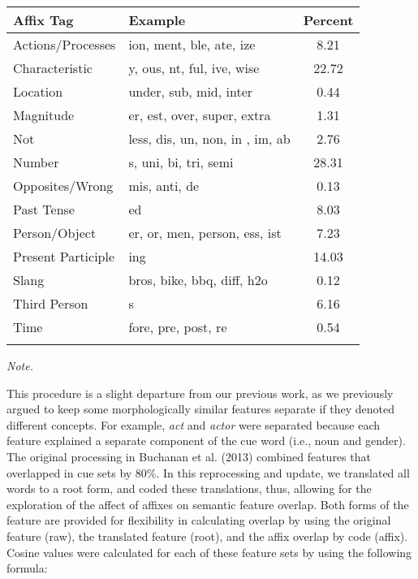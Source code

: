 \documentclass[english,man]{apa6}
\theoremstyle{definition}
\theoremstyle{definition}
\theoremstyle{definition}
\theoremstyle{remark}
\begin{document}
\begin{table}[tbp]
\begin{center}
\begin{threeparttable}
\caption{\label{tab:affix-table}}
\begin{tabular}{llc}
\toprule
Affix Tag & Example & Percent\\
\midrule
Actions/Processes & ion, ment, ble, ate, ize & 8.21\\
Characteristic & y, ous, nt, ful, ive, wise & 22.72\\
Location & under, sub, mid, inter & 0.44\\
Magnitude & er, est, over, super, extra & 1.31\\
Not & less, dis, un, non, in , im, ab & 2.76\\
Number & s, uni, bi, tri, semi & 28.31\\
Opposites/Wrong & mis, anti, de & 0.13\\
Past Tense & ed & 8.03\\
Person/Object & er, or, men, person, ess, ist & 7.23\\
Present Participle & ing & 14.03\\
Slang & bros, bike, bbq, diff, h2o & 0.12\\
Third Person & s & 6.16\\
Time & fore, pre, post, re & 0.54\\
\bottomrule
\addlinespace
\end{tabular}
\begin{tablenotes}[para]
\textit{Note.} 
\end{tablenotes}
\end{threeparttable}
\end{center}
\end{table}

This procedure is a slight departure from our previous work, as we
previously argued to keep some morphologically similar features separate
if they denoted different concepts. For example, \emph{act} and
\emph{actor} were separated because each feature explained a separate
component of the cue word (i.e., noun and gender). The original
processing in Buchanan et al. (2013) combined features that overlapped
in cue sets by 80\%. In this reprocessing and update, we translated all
words to a root form, and coded these translations, thus, allowing for
the exploration of the affect of affixes on semantic feature overlap.
Both forms of the feature are provided for flexibility in calculating
overlap by using the original feature (raw), the translated feature
(root), and the affix overlap by code (affix). Cosine values were
calculated for each of these feature sets by using the following
formula:
\end{document}

